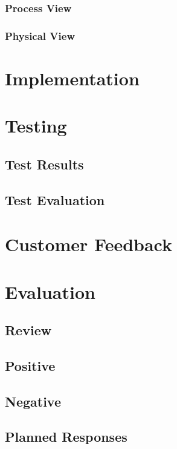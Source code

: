 \subsubsection{Process View}
\subsubsection{Physical View}
\section{Implementation}
\section{Testing}
\subsection{Test Results}
\subsection{Test Evaluation}
\section{Customer Feedback}
\section{Evaluation}
\subsection{Review}
\subsection{Positive}
\subsection{Negative}
\subsection{Planned Responses}
